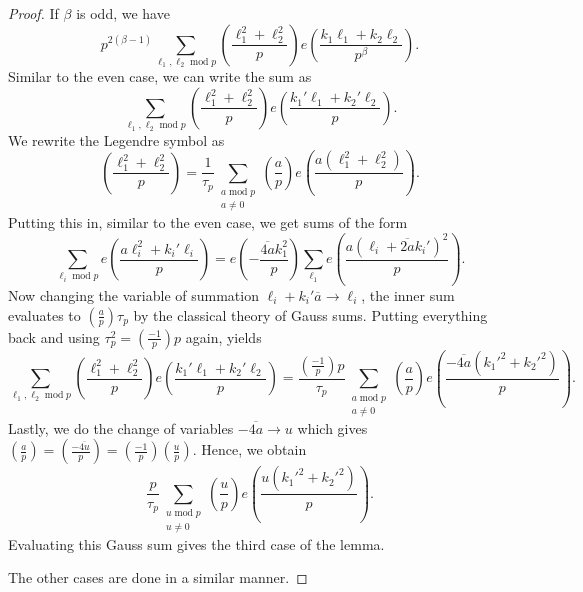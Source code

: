\documentclass[10pt,a4paper]{amsart}
\def\mod{\operatorname{mod}}
\begin{document}
\begin{proof}
    If $\beta$ is odd, we have
    $$ p^{2(\beta-1)} \sum_{\ell_1 , \ell_2 \mod p} \left( \frac{\ell_1^2+\ell_2^2}{p} \right) e\left( \frac{k_1 \ell_1 + k_2 \ell_2}{p^{\beta}} \right) . $$
    Similar to the even case, we can write the sum as
    $$ \sum_{\ell_1 , \ell_2 \mod p} \left( \frac{\ell_1^2+\ell_2^2}{p} \right) e\left( \frac{k_1' \ell_1 + k_2' \ell_2}{p} \right) .$$
    We rewrite the Legendre symbol as
    $$ \left( \frac{\ell_1^2+\ell_2^2}{p} \right) = \frac{1}{\tau_p} \sum_{\substack{a \mod p \\ a\not=0}} \left( \frac{a}{p}\right) e\left( \frac{a(\ell_1^2+\ell_2^2)}{p} \right) . $$
    Putting this in, similar to the even case, we get sums of the form
    $$ \sum_{\ell_i \mod p} e\left( \frac{a\ell_i^2 + k_i' \ell_i}{p} \right) = e\left( - \frac{\overline{4a}k_1^2}{p} \right) \sum_{\ell_1} e\left( \frac{a(\ell_i + \overline{2a} k_i')^2}{p} \right). $$
    Now changing the variable of summation $\ell_i + k_i' \overline{a} \to \ell_i$, the inner sum evaluates to $\left( \frac{a}{p} \right)\tau_p$ by the classical theory of Gauss sums. Putting everything back and using $\tau_p^2 = \left( \frac{-1}{p} \right)p $ again, yields
    $$ \sum_{\ell_1 , \ell_2 \mod p} \left( \frac{\ell_1^2+\ell_2^2}{p} \right) e\left( \frac{k_1' \ell_1 + k_2' \ell_2}{p} \right) = \frac{\left(\frac{-1}{p} \right) p}{\tau_p} \sum_{\substack{a \mod p \\ a\not=0}} \left( \frac{a}{p} \right) e\left( \frac{-\overline{4a}(k_1'^2+k_2'^2)}{p} \right) .$$
    Lastly, we do the change of variables $-\overline{4a} \to u$ which gives $\left( \frac{a}{p} \right) = \left( \frac{-\overline{4u}}{p} \right) = \left( \frac{-1}{p} \right)\left( \frac{u}{p} \right)$. Hence, we obtain
    $$ \frac{p}{\tau_p} \sum_{\substack{u \mod p \\ u\not=0}} \left(\frac{u}{p} \right) e\left( \frac{u(k_1'^2+k_2'^2)}{p} \right) .$$
    Evaluating this Gauss sum gives the third case of the lemma.

    The other cases are done in a similar manner.
\end{proof}
\end{document}
